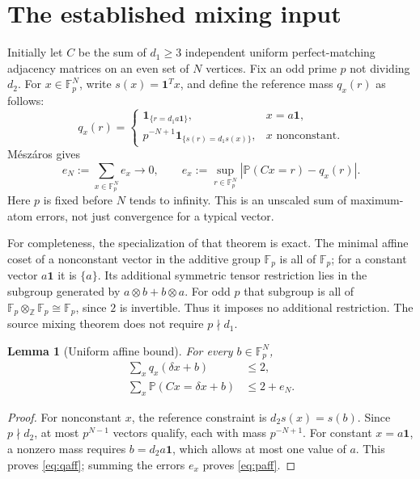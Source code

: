 \documentclass[11pt]{article}
\newtheorem{lemma}{Lemma}
\newcommand{\Fp}{\mathbb F_p}
\newcommand{\one}{\mathbf 1}
\newcommand{\Prob}{\mathbb P}
\begin{document}
\section{The established mixing input}
Initially let $C$ be the sum of $d_1\ge3$ independent uniform perfect-matching adjacency matrices on an even set of $N$ vertices. Fix an odd prime $p$ not dividing $d_2$. For $x\in\Fp^N$, write $s(x)=\one^Tx$, and define the reference mass $q_x(r)$ as follows:
\[
 q_x(r)=\begin{cases}
  \boldsymbol 1_{\{r=d_1a\one\}},&x=a\one,\\
  p^{-N+1}\boldsymbol 1_{\{s(r)=d_1s(x)\}},&x\text{ nonconstant}.
 \end{cases}
\]
M\'esz\'aros \cite[Theorem 1.6]{meszaros} gives
\begin{equation}\label{eq:mix}
 e_N:=\sum_{x\in\Fp^N}e_x\longrightarrow0,
 \qquad e_x:=\sup_{r\in\Fp^N}|\Prob(Cx=r)-q_x(r)|.
\end{equation}
Here $p$ is fixed before $N$ tends to infinity. This is an unscaled sum of maximum-atom errors, not just convergence for a typical vector.

For completeness, the specialization of that theorem is exact. The minimal affine coset of a nonconstant vector in the additive group $\Fp$ is all of $\Fp$; for a constant vector $a\one$ it is $\{a\}$. Its additional symmetric tensor restriction lies in the subgroup generated by $a\otimes b+b\otimes a$. For odd $p$ that subgroup is all of $\Fp\otimes_{\mathbb Z}\Fp\cong\Fp$, since $2$ is invertible. Thus it imposes no additional restriction. The source mixing theorem does not require $p\nmid d_1$.

\begin{lemma}[Uniform affine bound]\label{lem:affine}
For every $b\in\Fp^N$,
\begin{align}
 \sum_x q_x(\delta x+b)&\le2,\label{eq:qaff}\\
 \sum_x\Prob(Cx=\delta x+b)&\le2+e_N.\label{eq:paff}
\end{align}
\end{lemma}
\begin{proof}
For nonconstant $x$, the reference constraint is
$d_2s(x)=s(b)$. Since $p\nmid d_2$, at most $p^{N-1}$ vectors qualify, each with mass $p^{-N+1}$. For constant $x=a\one$, a nonzero mass requires $b=d_2a\one$, which allows at most one value of $a$. This proves \eqref{eq:qaff}; summing the errors $e_x$ proves \eqref{eq:paff}.
\end{proof}
\end{document}

